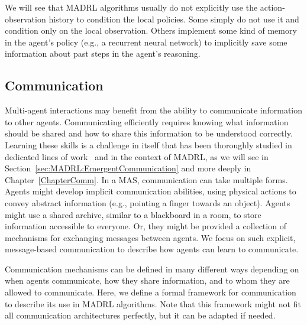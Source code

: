 We will see that MADRL algorithms usually do not explicitly use the action-observation history to condition the local policies. Some simply do not use it and condition only on the local observation. Others implement some kind of memory in the agent's policy (e.g., a recurrent neural network) to implicitly save some information about past steps in the agent's reasoning. 





\subsection{Communication}\label{sec:MAL:Comm_def}

Multi-agent interactions may benefit from the ability to communicate information to other agents. Communicating efficiently requires knowing what information should be shared and how to share this information to be understood correctly. Learning these skills is a challenge in itself that has been thoroughly studied in dedicated lines of work~\citep{Austin1975_SpeechActs, Farrell1996_CheapTalk, Brighton2005_LanguageAsEvo, Galke2022_Emergent} and in the context of MADRL, as we will see in Section~\ref{sec:MADRL:EmergentCommunication} and more deeply in Chapter~\ref{ChapterComm}. In a MAS, communication can take multiple forms. Agents might develop implicit communication abilities, using physical actions to convey abstract information (e.g., pointing a finger towards an object). Agents might use a shared archive, similar to a blackboard in a room, to store information accessible to everyone. Or, they might be provided a collection of mechanisms for exchanging messages between agents. We focus on such explicit, message-based communication to describe how agents can learn to communicate. 

Communication mechanisms can be defined in many different ways depending on when agents communicate, how they share information, and to whom they are allowed to communicate. Here, we define a formal framework for communication to describe its use in MADRL algorithms. Note that this framework might not fit all communication architectures perfectly, but it can be adapted if needed. 

